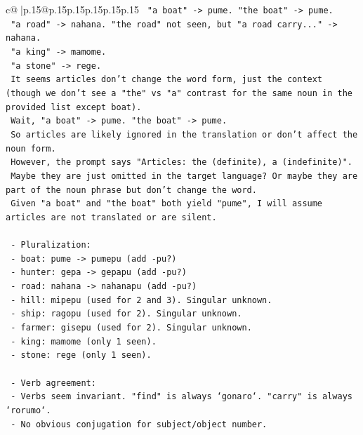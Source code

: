 \documentclass{article}
\begin{document}
{\begin{supertabular}{c@{$\;$}|p{.15\linewidth}@{}p{.15\linewidth}p{.15\linewidth}p{.15\linewidth}p{.15\linewidth}p{.15\linewidth}}
{{{\texttt{         "a boat" {-}> pume. "the boat" {-}> pume.} \\
\texttt{         "a road" {-}> nahana. "the road" not seen, but "a road carry..." {-}> nahana.} \\
\texttt{         "a king" {-}> mamome.} \\
\texttt{         "a stone" {-}> rege.} \\
\texttt{         It seems articles don't change the word form, just the context (though we don't see a "the" vs "a" contrast for the same noun in the provided list except boat).} \\
\texttt{         Wait, "a boat" {-}> pume. "the boat" {-}> pume.} \\
\texttt{         So articles are likely ignored in the translation or don't affect the noun form.} \\
\texttt{         However, the prompt says "Articles: the (definite), a (indefinite)".} \\
\texttt{         Maybe they are just omitted in the target language? Or maybe they are part of the noun phrase but don't change the word.} \\
\texttt{         Given "a boat" and "the boat" both yield "pume", I will assume articles are not translated or are silent.} \\
\\ 
\texttt{     {-} Pluralization:} \\
\texttt{       {-} boat: pume {-}> pumepu (add {-}pu?)} \\
\texttt{       {-} hunter: gepa {-}> gepapu (add {-}pu?)} \\
\texttt{       {-} road: nahana {-}> nahanapu (add {-}pu?)} \\
\texttt{       {-} hill: mipepu (used for 2 and 3). Singular unknown.} \\
\texttt{       {-} ship: ragopu (used for 2). Singular unknown.} \\
\texttt{       {-} farmer: gisepu (used for 2). Singular unknown.} \\
\texttt{       {-} king: mamome (only 1 seen).} \\
\texttt{       {-} stone: rege (only 1 seen).} \\
\\ 
\texttt{     {-} Verb agreement:} \\
\texttt{       {-} Verbs seem invariant. "find" is always `gonaro`. "carry" is always `rorumo`.} \\
\texttt{       {-} No obvious conjugation for subject/object number.} \\
}}}
\end{supertabular}}
\end{document}
